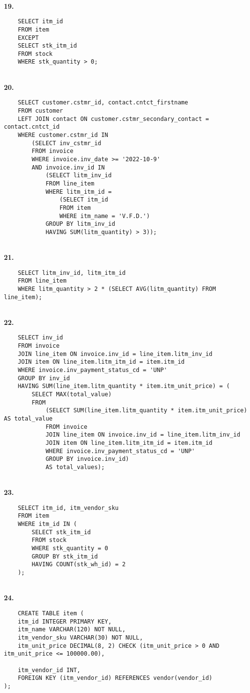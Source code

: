 \documentclass[letterpaper,11pt]{article}
\newcommand{\Paragraph}[1]{~\vspace*{-0.7\baselineskip}\\{\bf #1}}
\begin{document}
\Paragraph{19.}
\begin{verbatim}
	SELECT itm_id
	FROM item
	EXCEPT
	SELECT stk_itm_id
	FROM stock
	WHERE stk_quantity > 0;

\end{verbatim}

\newpage
\Paragraph{20.}
\begin{verbatim}
	SELECT customer.cstmr_id, contact.cntct_firstname
	FROM customer
	LEFT JOIN contact ON customer.cstmr_secondary_contact = contact.cntct_id
	WHERE customer.cstmr_id IN 
		(SELECT inv_cstmr_id
		FROM invoice
		WHERE invoice.inv_date >= '2022-10-9'
		AND invoice.inv_id IN 
			(SELECT litm_inv_id
			FROM line_item
			WHERE litm_itm_id = 
				(SELECT itm_id
				FROM item
				WHERE itm_name = 'V.F.D.')
			GROUP BY litm_inv_id
			HAVING SUM(litm_quantity) > 3));
\end{verbatim}


\Paragraph{21.}
\begin{verbatim}
	SELECT litm_inv_id, litm_itm_id
	FROM line_item
	WHERE litm_quantity > 2 * (SELECT AVG(litm_quantity) FROM line_item);
\end{verbatim}


\Paragraph{22. }
\begin{verbatim}
	SELECT inv_id
	FROM invoice
	JOIN line_item ON invoice.inv_id = line_item.litm_inv_id
	JOIN item ON line_item.litm_itm_id = item.itm_id
	WHERE invoice.inv_payment_status_cd = 'UNP'
	GROUP BY inv_id
	HAVING SUM(line_item.litm_quantity * item.itm_unit_price) = (
		SELECT MAX(total_value)
		FROM
			(SELECT SUM(line_item.litm_quantity * item.itm_unit_price) AS total_value
			FROM invoice
			JOIN line_item ON invoice.inv_id = line_item.litm_inv_id
			JOIN item ON line_item.litm_itm_id = item.itm_id
			WHERE invoice.inv_payment_status_cd = 'UNP'
			GROUP BY invoice.inv_id) 
			AS total_values);
\end{verbatim}

\newpage
\Paragraph{23.}
\begin{verbatim}
	SELECT itm_id, itm_vendor_sku
	FROM item
	WHERE itm_id IN (
		SELECT stk_itm_id
		FROM stock
		WHERE stk_quantity = 0
		GROUP BY stk_itm_id
		HAVING COUNT(stk_wh_id) = 2
	);

\end{verbatim}


\Paragraph{24.}
\begin{verbatim}
	CREATE TABLE item (
    itm_id INTEGER PRIMARY KEY,            
    itm_name VARCHAR(120) NOT NULL,
	itm_vendor_sku VARCHAR(30) NOT NULL,     
    itm_unit_price DECIMAL(8, 2) CHECK (itm_unit_price > 0 AND itm_unit_price <= 100000.00),  
     
    itm_vendor_id INT,                
    FOREIGN KEY (itm_vendor_id) REFERENCES vendor(vendor_id) 
);

\end{verbatim}
\end{document}
